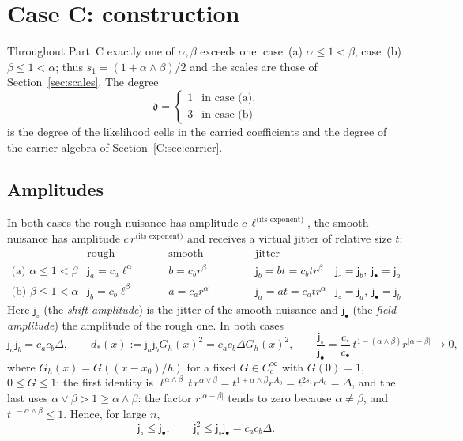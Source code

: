 \documentclass[11pt]{article}
\newcommand{\abs}[1]{\lvert #1\rvert}
\newcommand{\ja}{\mathsf{j}_a}
\newcommand{\jb}{\mathsf{j}_b}
\newcommand{\jsh}{\mathsf{j}_\circ}
\newcommand{\jfi}{\mathsf{j}_\bullet}
\newcommand{\dg}{\mathfrak{d}}
\begin{document}
\section{Case C: construction}\label{C:sec:construction}

Throughout Part~C exactly one of \(\alpha,\beta\) exceeds one:
case~(a) \(\alpha\le1<\beta\), case~(b) \(\beta\le1<\alpha\); thus
\(s_1=(1+\alpha\wedge\beta)/2\) and the scales are those of
Section~\ref{sec:scales}.  The degree
\[
 \dg=\begin{cases}1&\text{in case (a)},\\3&\text{in case (b)}\end{cases}
\]
is the degree of the likelihood cells in the carried coefficients and the
degree of the carrier algebra of Section~\ref{C:sec:carrier}.

\subsection{Amplitudes}
In both cases the rough nuisance has amplitude \(c\,\ell^{\text{(its
exponent)}}\), the smooth nuisance has amplitude \(c\,r^{\text{(its
exponent)}}\) and receives a virtual jitter of relative size \(t\):
\begin{equation}
\begin{array}{c|ccc|c}
 &\text{rough amplitude}&\text{smooth amplitude}&\text{jitter}&\\ \hline
 \text{(a) }\alpha\le1<\beta&\ja=c_a\ell^\alpha&b=c_br^\beta&\jb=bt=c_btr^\beta&\jsh=\jb,\ \jfi=\ja\\
 \text{(b) }\beta\le1<\alpha&\jb=c_b\ell^\beta&a=c_ar^\alpha&\ja=at=c_atr^\alpha&\jsh=\ja,\ \jfi=\jb
\end{array}
\label{C:eq:amplitudes}
\end{equation}
Here \(\jsh\) (the \emph{shift amplitude}) is the jitter of the smooth
nuisance and \(\jfi\) (the \emph{field amplitude}) the amplitude of the
rough one.  In both cases
\begin{equation}
 \ja\jb=c_ac_b\Delta,\qquad
 d_*(x):=\ja\jb G_h(x)^2=c_ac_b\Delta G_h(x)^2,\qquad
 \frac{\jsh}{\jfi}=\frac{c_\circ}{c_\bullet}\,t^{1-(\alpha\wedge\beta)}r^{\abs{\alpha-\beta}}\to0,
 \label{C:eq:jsh-over-jfi}
\end{equation}
where \(G_h(x)=G((x-x_0)/h)\) for a fixed \(G\in C_c^\infty\) with
\(G(0)=1\), \(0\le G\le1\); the first identity is
\(\ell^{\alpha\wedge\beta}\,t\,r^{\alpha\vee\beta}=t^{1+\alpha\wedge\beta}r^{A_0}=t^{2s_1}r^{A_0}=\Delta\),
and the last uses \(\alpha\vee\beta>1\ge\alpha\wedge\beta\): the factor
\(r^{\abs{\alpha-\beta}}\) tends to zero because \(\alpha\ne\beta\), and
\(t^{1-\alpha\wedge\beta}\le1\).  Hence, for large \(n\),
\begin{equation}
 \jsh\le\jfi,\qquad \jsh^2\le\jsh\jfi=c_ac_b\Delta .
 \label{C:eq:jsh-square}
\end{equation}
\end{document}
